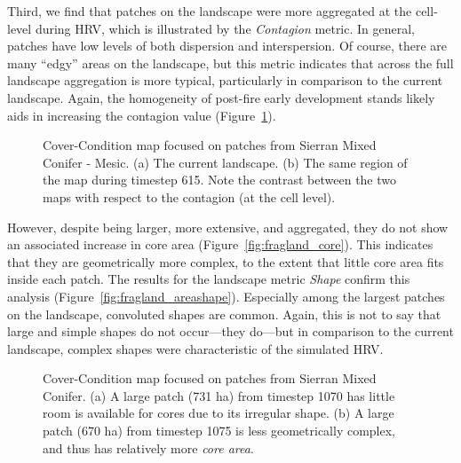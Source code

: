 Third, we find that patches on the landscape were more aggregated at the cell-level during HRV, which is illustrated by the \emph{Contagion} metric. In general, patches have low levels of both dispersion and interspersion. Of course, there are many ``edgy'' areas on the landscape, but this metric indicates that across the full landscape aggregation is more typical, particularly in comparison to the current landscape. Again, the homogeneity of post-fire early development stands likely aids in increasing the contagion value (Figure~\ref{fig:patchmaps3}). 
\begin{figure}[!htbp]
  \centering
  \caption{Cover-Condition map focused on patches from Sierran Mixed Conifer - Mesic. (a) The current landscape. (b) The same region of the map during timestep 615. Note the contrast between the two maps with respect to the contagion (at the cell level).} 
  \label{fig:patchmaps3}
\end{figure}

However, despite being larger, more extensive, and aggregated, they do not show an associated increase in core area (Figure~\ref{fig:fragland_core}). This indicates that they are geometrically more complex, to the extent that little core area fits inside each patch. The results for the landscape metric \emph{Shape} confirm this analysis (Figure~\ref{fig:fragland_areashape}). Especially among the largest patches on the landscape, convoluted shapes are common. Again, this is not to say that large and simple shapes do not occur---they do---but in comparison to the current landscape, complex shapes were characteristic of the simulated HRV.
\begin{figure}[!htbp]
  \centering
  \caption{Cover-Condition map focused on patches from Sierran Mixed Conifer. (a) A large patch (731 ha) from timestep 1070 has little room is available for cores due to its irregular shape. (b) A large patch (670 ha) from timestep 1075 is less geometrically complex, and thus has relatively more \emph{core area}.} 
  \label{fig:patchmaps4}
\end{figure}

